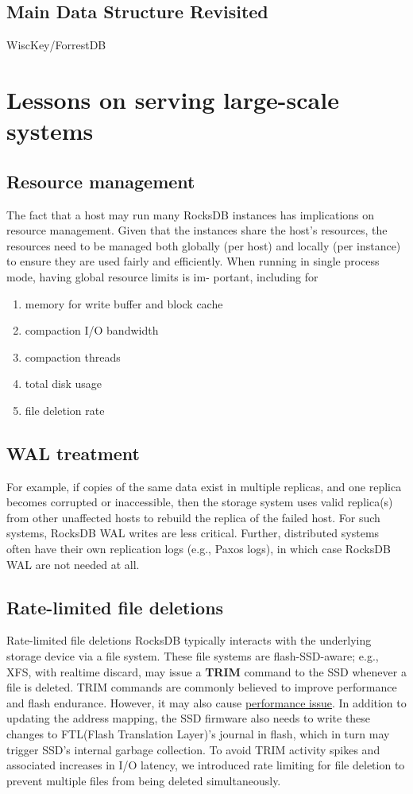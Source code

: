 \documentclass[11pt]{article}
\begin{document}
\subsection{Main Data Structure Revisited}
\label{sec:org27ed733}
WiscKey/ForrestDB
\section{Lessons on serving large-scale systems}
\label{sec:org95862dc}
\subsection{Resource management}
\label{sec:orgdf3af3a}
The fact that a host may run many RocksDB instances has implications on resource management. Given
that the instances share the host’s resources, the resources need to be managed both globally (per
host) and locally (per instance) to ensure they are used fairly and efficiently. When running in
single process mode, having global resource limits is im- portant, including for
\begin{enumerate}
\item memory for write buffer and block cache
\item compaction I/O bandwidth
\item compaction threads
\item total disk usage
\item file deletion rate
\end{enumerate}
\subsection{WAL treatment}
\label{sec:org0793894}
For example, if copies of the same data exist in multiple replicas, and one replica becomes corrupted
or inaccessible, then the storage system uses valid replica(s) from other unaffected hosts to rebuild
the replica of the failed host. For such systems, RocksDB WAL writes are less critical. Further,
distributed systems often have their own replication logs (e.g., Paxos logs), in which case RocksDB
WAL are not needed at all.
\subsection{Rate-limited file deletions}
\label{sec:org15b1c86}
Rate-limited file deletions RocksDB typically interacts with the underlying storage device via a file
system. These file systems are flash-SSD-aware; e.g., XFS, with realtime discard, may issue a \textbf{TRIM}
command to the SSD whenever a file is deleted. TRIM commands are commonly believed to improve
performance and flash endurance. However, it may also cause \uline{performance issue}. In addition to updating
the address mapping, the SSD firmware also needs to write these changes to FTL(Flash Translation
Layer)'s journal in flash, which in turn may trigger SSD's internal garbage collection. To avoid TRIM
activity spikes and associated increases in I/O latency, we introduced rate limiting for file deletion
to prevent multiple files from being deleted simultaneously.
\end{document}
